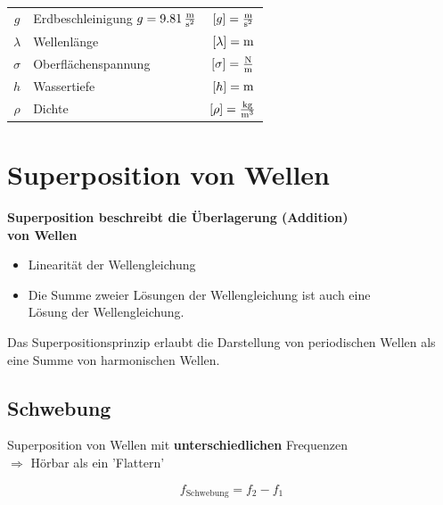 \vspace{0.2cm}

\renewcommand{\arraystretch}{1.1}
\begin{tabular}{clc}
$g$ & Erdbeschleinigung $g = 9.81 \, \frac{\mathrm{m}}{\mathrm{s}^2}$ & $[g] = \frac{\mathrm{m}}{\mathrm{s}^2}$ \\
$\lambda$ & Wellenlänge & $[\lambda] = \mathrm{m} $ \\
$\sigma$ & Oberflächenspannung & $[\sigma] = \frac{\mathrm{N}}{\mathrm{m}} $ \\
$h$ & Wassertiefe & $[h] = \mathrm{m}$ \\
$\rho$ & Dichte & $[\rho] = \frac{\mathrm{kg}}{\mathrm{m}^3}$
\end{tabular}
\renewcommand{\arraystretch}{1}










\section{Superposition von Wellen}

\textbf{Superposition beschreibt die Überlagerung (Addition) \\
von Wellen} \\

\begin{itemize}

	\item Linearität der Wellengleichung 
	\item Die Summe zweier Lösungen der Wellengleichung ist auch eine \\
		Lösung der Wellengleichung. \\

\end{itemize}

Das Superpositionsprinzip erlaubt die Darstellung von periodischen Wellen als eine Summe von harmonischen Wellen.




\subsection{Schwebung}

Superposition von Wellen mit \textbf{unterschiedlichen} Frequenzen \\
$\Rightarrow$ Hörbar als ein 'Flattern' 

$$ \boxed{f_{\text{Schwebung}} = f_2 - f_1 } $$ \\


